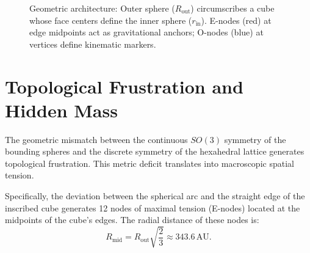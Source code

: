 \documentclass[11pt,a4paper]{article}
\theoremstyle{remark}
\newcommand{\AU}{\,\mathrm{AU}}
\begin{document}
\begin{figure}[htbp]
\centering
{}
\caption{Geometric architecture: Outer sphere ($R_{\text{out}}$) circumscribes a cube whose face centers define the inner sphere ($r_{\text{in}}$). E-nodes (red) at edge midpoints act as gravitational anchors; O-nodes (blue) at vertices define kinematic markers.}
\label{fig:geometry}
\end{figure}

\section{Topological Frustration and Hidden Mass}

The geometric mismatch between the continuous $SO(3)$ symmetry of the bounding spheres and the discrete symmetry of the hexahedral lattice generates topological frustration. This metric deficit translates into macroscopic spatial tension.

Specifically, the deviation between the spherical arc and the straight edge of the inscribed cube generates 12 nodes of maximal tension (E-nodes) located at the midpoints of the cube's edges. The radial distance of these nodes is:
\begin{equation}
    R_{\text{mid}} = R_{\text{out}} \sqrt{\frac{2}{3}} \approx 343.6\AU.
    \label{eq:mid_radius}
\end{equation}
\end{document}
